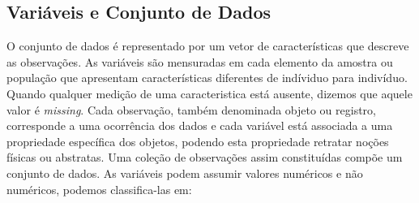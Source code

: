 \subsection{Variáveis e Conjunto de Dados}
O conjunto de dados é representado por um vetor de características que descreve as observações. As variáveis são mensuradas em cada elemento da amostra ou população que apresentam características diferentes de indíviduo para indivíduo. 
Quando qualquer medição de uma caracteristica está ausente, dizemos que aquele valor é \textit{missing}. Cada observação, também denominada objeto ou registro, corresponde a uma ocorrência dos dados e cada variável está associada a uma propriedade específica dos objetos, podendo esta propriedade retratar noções físicas ou abstratas. Uma coleção de observações assim constituídas compõe um conjunto de dados. 
As variáveis podem assumir valores numéricos e não numéricos, podemos classifica-las em:

